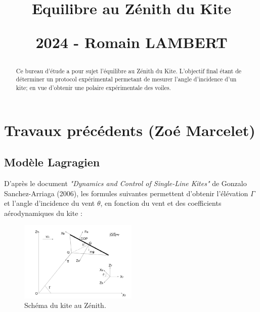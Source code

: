 \documentclass[conference]{IEEEtran}
\begin{document}
\title{\LARGE Equilibre au Zénith du Kite
\vskip10pt

\small 2024 - Romain LAMBERT
}
\maketitle

\begin{abstract}Ce bureau d'étude a pour sujet l'équilibre au Zénith du Kite. L'objectif final étant de déterminer un protocol expérimental permetant de mesurer l'angle d'incidence d'un kite; en vue d'obtenir une polaire expérimentale des voiles. 
\end{abstract}
\IEEEoverridecommandlockouts

\IEEEpeerreviewmaketitle
\section{Travaux précédents (Zoé Marcelet)}

\subsection{Modèle Lagragien} 

D'après le document \textit{"Dynamics and Control of Single-Line Kites"} de Gonzalo Sanchez-Arriaga (2006),  les formules suivantes permettent d'obtenir l'élévation $\Gamma$ et l'angle d'incidence du vent $\theta$, en fonction du vent et des coefficients aérodynamiques du kite : \\

\begin{figure}[H]
    \centering
    \includegraphics[width=0.5\textwidth]{Pics/Picture Sanchez.png}  
    \caption{Schéma du kite au Zénith.}
    \label{fig:sanchez}
\end{figure}
\end{document}
